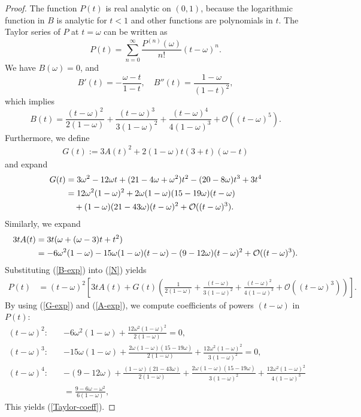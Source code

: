 \documentclass[12pt,reqno]{amsart}
\numberwithin{equation}{section}
\numberwithin{figure}{section}
\begin{document}
	\begin{proof}
		The function $P(t)$ is real analytic on $(0,1)$, because the logarithmic function in $B$ is analytic for $t < 1$ 
		and other functions are polynomials in $t$. The Taylor series 
		of $P$ at $t = \omega$ can be written as 
		\begin{equation*}
		P(t) = \sum_{n=0}^\infty \frac{P^{(n)}(\omega)}{n!}(t-\omega)^n.
		\end{equation*}
		We have $B(\omega) = 0$, and
\begin{equation}
\label{der-B}
B'(t) = -\frac{\omega - t}{1-t}, \quad B''(t) = \frac{1-\omega}{(1-t)^2},
\end{equation}	
which implies 
\begin{equation}
\label{B-exp}
B(t) = \frac{(t-\omega)^2}{2(1-\omega)} + \frac{(t-\omega)^3}{3 (1-\omega)^2} + \frac{(t-\omega)^4}{4 (1-\omega)^3} + \mathcal{O}((t-\omega)^5).
\end{equation}
Furthermore, we define
\begin{align}
G(t) := 3A(t)^2 +  2  (1-\omega) t (3 + t) (\omega - t) \label{G-def}
\end{align}
and expand
\begin{align}
G(t) &= 3 \omega^2 - 12 \omega t + (21 - 4 \omega + \omega^2) t^2 - (20 - 8 \omega) t^3 + 3 t^4  \notag \\
&= 12 \omega^2 (1 -  \omega)^2 + 2\omega (1 - \omega)(15 - 19\omega) (t-\omega) \notag \\
& \quad + 
(1-\omega) (21 - 43 \omega) (t-\omega)^2 + \mathcal{O}((t-\omega)^3). \label{G-exp}
\end{align}	
Similarly, we expand
\begin{align}
3t A(t) &= 3 t (\omega + (\omega-3) t + t^2) \notag \\
&= -6 \omega^2 (1 -  \omega) - 15 \omega (1 - \omega) (t-\omega) - 
(9 - 12 \omega) (t-\omega)^2 + \mathcal{O}((t-\omega)^3).
\label{A-exp}
\end{align}	
Substituting (\ref{B-exp}) into (\ref{N}) yields 
\begin{align*}
P(t) &= (t-\omega)^2 \left[ 3 t A(t) + G(t) \left( \frac{1}{2(1-\omega)} + \frac{(t-\omega)}{3 (1-\omega)^2} + \frac{(t-\omega)^2}{4 (1-\omega)^3} + \mathcal{O}((t-\omega)^3) \right) \right].
\end{align*}	
By using (\ref{G-exp}) and (\ref{A-exp}), we compute coefficients of powers $(t-\omega)$ in $P(t)$:
\begin{align*}
(t-\omega)^2 : \quad & -6 \omega^2 (1 -  \omega) + \frac{12 \omega^2 (1 -  \omega)^2}{2(1-\omega)} = 0, \\
(t-\omega)^3 : \quad & - 15 \omega (1 - \omega) + \frac{2\omega (1 - \omega)(15 - 19\omega)}{2(1-\omega)} + \frac{12 \omega^2 (1 -  \omega)^2}{3 (1-\omega)^2} = 0, \\
(t-\omega)^4 : \quad & - (9 - 12 \omega) + \frac{(1-\omega) (21 - 43 \omega)}{2(1-\omega)} + \frac{2\omega (1 - \omega)(15 - 19\omega)}{3 (1-\omega)^2} + \frac{12 \omega^2 (1 -  \omega)^2}{4 (1-\omega)^3} \\
& = \frac{9-6\omega-\omega^2}{6(1-\omega)},
\end{align*}
This yields (\ref{Taylor-coeff}).	


\end{proof}
\end{document}
